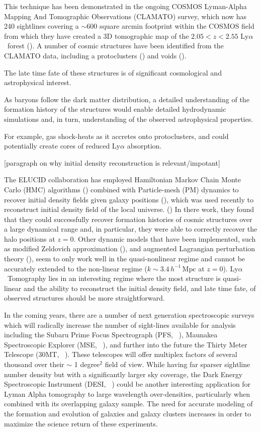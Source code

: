 \documentclass[usenatbib,onecolumn]{mnras}
\newcommand{\mpc}{\ensuremath{\, h^{-1}\,\mathrm{Mpc} }}
\newcommand{\lya}{Ly$\alpha$}
\begin{document}
This technique has been demonstrated in the ongoing COSMOS Lyman-Alpha Mapping And 
Tomographic Observations (CLAMATO) survey, which now has 240 sightlines covering a $\sim 600$ square arcmin footprint within 
the COSMOS field from which they have created a 3D tomographic map of the $2.05<z<2.55$ \lya\ forest (\cite{Lee2017}). A number of cosmic structures have been identified from the CLAMATO data, including a protoclusters (\cite{2015StarkProtocluster}) and voids (\cite{2018Krolewski}).

The late time fate of these structures is of significant cosmological and astrophysical interest. 

As baryons follow the dark matter distribution, a detailed understanding of the formation history of the structures would enable detailed hydrodynamic simulations and, in turn, understanding of the observed astrophysical properties. 

For example, gas shock-heats as it accretes onto protoclusters, and could potentially create cores of reduced Ly$\alpha$ absorption.

[paragraph on why initial density reconstruction is relevant/impotant]

The ELUCID collaboration has employed Hamiltonian Markov Chain Monte Carlo (HMC) algorithms (\cite{HMC}) combined with
Particle-mesh (PM) dynamics to recover initial density fields given galaxy positions (\cite{ECULID1}), which was used recently to reconstruct initial density field of the local universe. (\cite{ECULID3}) In there work, they found that they could successfully recover formation histories of cosmic structures over a large dynamical range and, in particular, they were able to correctly recover the halo positions at $z=0$. Other dynamic models that have been implemented, such as modified Zeldovich approximation (\cite{TZ}), and augmented Lagrangian perturbation theory (\cite{KH}), seem to only work well in the quasi-nonlinear regime and cannot be accurately extended to the non-linear regime ($k \sim 3.4 \mpc$ at $z=0$). \lya\ Tomography lies in an interesting regime where the most structure is quasi-linear and the ability to reconstruct the initial density field, and late time fate, of observed structures should be more straightforward.

In the coming years, there are a number of next generation spectroscopic surveys which will radically increase the number of sight-lines available for analysis including the Subaru Prime Focus Spectrograph (PFS, ~\cite{subaru}), Maunakea Spectroscopic Explorer (MSE, ~\cite{2016MSE}), and further into the future the Thirty Meter Telescope (30MT, ~\cite{2015TMT}). These telescopes will offer multiplex factors of several thousand over their $\sim $ 1 degree$^2$ field of view. While having far sparser sightline number density but with a significantly larger sky coverage, the Dark Energy Spectroscopic Instrument (DESI, ~\cite{desi}) could be another interesting application for Lyman Alpha tomography to large wavelength over-densities, particularly when combined with its overlapping galaxy sample. The need for accurate modeling of the formation and evolution of galaxies and galaxy clusters increases in order to maximize the science return of these experiments.
\end{document}
